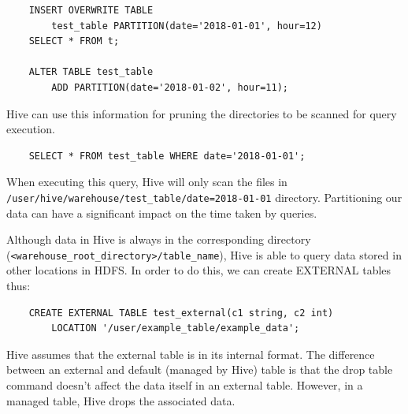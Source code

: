 \begin{lstlisting}
	INSERT OVERWRITE TABLE
		test_table PARTITION(date='2018-01-01', hour=12)
	SELECT * FROM t;
	
	ALTER TABLE test_table
		ADD PARTITION(date='2018-01-02', hour=11);
\end{lstlisting}

Hive can use this information for pruning the directories to be scanned for query execution. 
\begin{lstlisting}
	SELECT * FROM test_table WHERE date='2018-01-01';
\end{lstlisting}
When executing this query, Hive will only scan the files in \texttt{/user/hive/warehouse/test\_table/date=2018-01-01} directory. Partitioning our data can have a significant impact on the time taken by queries.

Although data in Hive is always in the corresponding directory (\texttt{<warehouse\_root\_directory>/table\_name}), Hive is able to query data stored in other locations in HDFS. In order to do this, we can create EXTERNAL tables thus:
\begin{lstlisting}
	CREATE EXTERNAL TABLE test_external(c1 string, c2 int)
		LOCATION '/user/example_table/example_data';
\end{lstlisting}

Hive assumes that the external table is in its internal format. The difference between an external and default (managed by Hive) table is that the drop table command doesn't affect the data itself in an external table. However, in a managed table, Hive drops the associated data.

